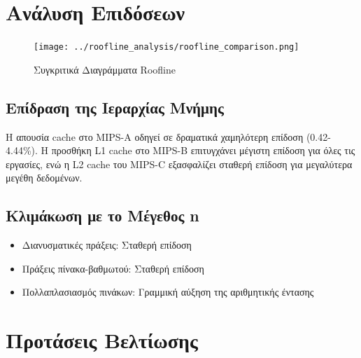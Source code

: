 \documentclass[11pt,a4paper]{article}
\begin{document}
\section{Ανάλυση Επιδόσεων}
\begin{figure}[H]
    \centering
    \texttt{[image: ../roofline\_analysis/roofline\_comparison.png]}
    \caption{Συγκριτικά Διαγράμματα Roofline}
    \label{fig:roofline}
\end{figure}

\subsection{Επίδραση της Ιεραρχίας Μνήμης}
Η απουσία cache στο MIPS-A οδηγεί σε δραματικά χαμηλότερη επίδοση (0.42-4.44\%). Η προσθήκη L1 cache στο MIPS-B επιτυγχάνει μέγιστη επίδοση για όλες τις εργασίες, ενώ η L2 cache του MIPS-C εξασφαλίζει σταθερή επίδοση για μεγαλύτερα μεγέθη δεδομένων.

\subsection{Κλιμάκωση με το Μέγεθος n}
\begin{itemize}
    \item Διανυσματικές πράξεις: Σταθερή επίδοση
    \item Πράξεις πίνακα-βαθμωτού: Σταθερή επίδοση
    \item Πολλαπλασιασμός πινάκων: Γραμμική αύξηση της αριθμητικής έντασης
\end{itemize}

\section{Προτάσεις Βελτίωσης}
\end{document}
